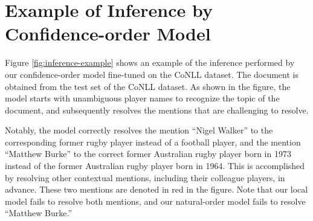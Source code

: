 \documentclass[11pt]{article}
\begin{document}
\section{Example of Inference by Confidence-order Model}
\label{sec:inference-example}

\begin{figure*}[tbhp]
  \centering
  \caption{An illustrative example showing the inference performed by our fine-tuned confidence-order model on a document in the CoNLL dataset. Mentions are shown as underlined. Numbers in boldface represent the selection order of the confidence-order model.}
  \label{fig:inference-example}
\end{figure*}

Figure \ref{fig:inference-example} shows an example of the inference performed by our confidence-order model fine-tuned on the CoNLL dataset.
The document is obtained from the test set of the CoNLL dataset.
As shown in the figure, the model starts with unambiguous player names to recognize the topic of the document, and subsequently resolves the mentions that are challenging to resolve.

Notably, the model correctly resolves the mention ``Nigel Walker'' to the corresponding former rugby player instead of a football player, and the mention ``Matthew Burke'' to the correct former Australian rugby player born in 1973 instead of the former Australian rugby player born in 1964. This is accomplished by resolving other contextual mentions, including their colleague players, in advance.
These two mentions are denoted in red in the figure.
Note that our local model fails to resolve both mentions, and our natural-order model fails to resolve ``Matthew Burke.''
\end{document}

